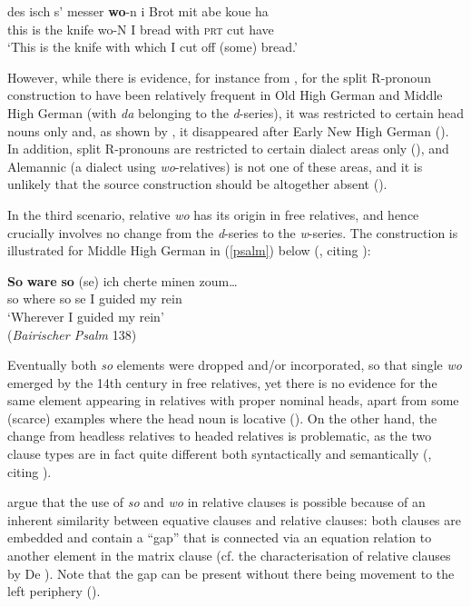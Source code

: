 \ea \gll des isch s' messer \textbf{wo}-n i Brot mit abe koue ha\\
this is the knife wo-N I  bread with \textsc{prt} cut have\\
\glt `This is the knife with which I cut off (some) bread.'
\z

However, while there is evidence, for instance from \citet{behaghel1928}, for the split R-pronoun construction to have been relatively frequent in Old High German and Middle High German (with \textit{da} belonging to the \textit{d}-series), it was restricted to certain head nouns only and, as shown by \citet{fleischer2008}, it disappeared after Early New High German (\citealt[142--143]{brandnerbraeuning2013}). In addition, split R-pronouns are restricted to certain dialect areas only (\citealt{fleischer2002, fleischer2008}), and Alemannic (a dialect using \textit{wo}-relatives) is not one of these areas, and it is unlikely that the source construction should be altogether absent (\citealt[143]{brandnerbraeuning2013}).

In the third scenario, relative \textit{wo} has its origin in free relatives, and hence crucially involves no change from the \textit{d}-series to the \textit{w}-series. The construction is illustrated for Middle High German in (\ref{psalm}) below (\citealt[144, ex. 30]{brandnerbraeuning2013}, citing \citealt{luehr1998}):

\ea \gll \textbf{So} \textbf{ware} \textbf{so} (se) ich cherte minen zoum\ldots{} \label{psalm}\\
so where so \phantom{(}se I guided my rein\\
\glt `Wherever I guided my rein'\\(\textit{Bairischer Psalm} 138)
\z

Eventually both \textit{so} elements were dropped and/or incorporated, so that single \textit{wo} emerged by the 14th century in free relatives, yet there is no evidence for the same element appearing in relatives with proper nominal heads, apart from some (scarce) examples where the head noun is locative (\citealt[144--146]{brandnerbraeuning2013}). On the other hand, the change from headless relatives to headed relatives is problematic, as the two clause types are in fact quite different both syntactically and semantically (\citealt[144--146]{brandnerbraeuning2013}, citing \citealt{caponigro2003diss}).

\citet[147--150]{brandnerbraeuning2013} argue that the use of \textit{so} and \textit{wo} in relative clauses is possible because of an inherent similarity between equative clauses and relative clauses: both clauses are embedded and contain a ``gap'' that is connected via an equation relation to another element in the matrix clause (cf. the characterisation of relative clauses by De \citealt{devries2006}). Note that the gap can be present without there being movement to the left periphery (\citealt[150--151]{brandnerbraeuning2013}).

